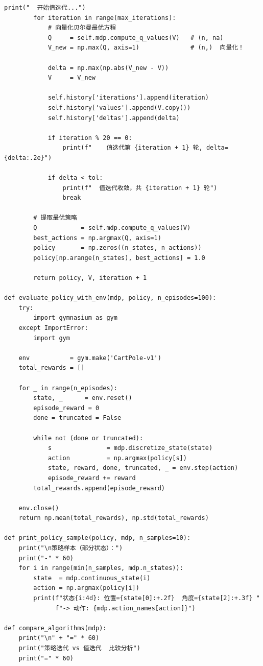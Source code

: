 \documentclass[12pt,a4paper]{article}
\begin{document}
\begin{lstlisting}[caption={策略迭代与值迭代算法完整实现（3.py）}]
        print("  开始值迭代...")
        for iteration in range(max_iterations):
            # 向量化贝尔曼最优方程
            Q     = self.mdp.compute_q_values(V)   # (n, na)
            V_new = np.max(Q, axis=1)              # (n,)  向量化！

            delta = np.max(np.abs(V_new - V))
            V     = V_new

            self.history['iterations'].append(iteration)
            self.history['values'].append(V.copy())
            self.history['deltas'].append(delta)

            if iteration % 20 == 0:
                print(f"    值迭代第 {iteration + 1} 轮, delta={delta:.2e}")

            if delta < tol:
                print(f"  值迭代收敛，共 {iteration + 1} 轮")
                break

        # 提取最优策略
        Q            = self.mdp.compute_q_values(V)
        best_actions = np.argmax(Q, axis=1)
        policy       = np.zeros((n_states, n_actions))
        policy[np.arange(n_states), best_actions] = 1.0

        return policy, V, iteration + 1

def evaluate_policy_with_env(mdp, policy, n_episodes=100):
    try:
        import gymnasium as gym
    except ImportError:
        import gym

    env           = gym.make('CartPole-v1')
    total_rewards = []

    for _ in range(n_episodes):
        state, _      = env.reset()
        episode_reward = 0
        done = truncated = False

        while not (done or truncated):
            s               = mdp.discretize_state(state)
            action          = np.argmax(policy[s])
            state, reward, done, truncated, _ = env.step(action)
            episode_reward += reward
        total_rewards.append(episode_reward)

    env.close()
    return np.mean(total_rewards), np.std(total_rewards)

def print_policy_sample(policy, mdp, n_samples=10):
    print("\n策略样本（部分状态）：")
    print("-" * 60)
    for i in range(min(n_samples, mdp.n_states)):
        state  = mdp.continuous_state(i)
        action = np.argmax(policy[i])
        print(f"状态{i:4d}: 位置={state[0]:+.2f}  角度={state[2]:+.3f} "
              f"-> 动作: {mdp.action_names[action]}")

def compare_algorithms(mdp):
    print("\n" + "=" * 60)
    print("策略迭代 vs 值迭代  比较分析")
    print("=" * 60)


\end{lstlisting}
\end{document}
